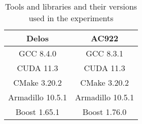 \begin{table}[H]
  \centering
  \begin{tabular}{||c | c||} 
   \hline
   Delos & AC922 \\ [0.5ex] 
   \hline\hline
   GCC 8.4.0 & GCC 8.3.1 \\
   CUDA 11.3 & CUDA 11.3 \\ 
   CMake 3.20.2 & CMake 3.20.2 \\
   Armadillo 10.5.1 & Armadillo 10.5.1 \\
   Boost 1.65.1 & Boost 1.76.0 \\ [1ex]
   \hline
  \end{tabular}
  \caption{Tools and libraries and their versions used in the experiments}
  \label{table:libversions}
\end{table}